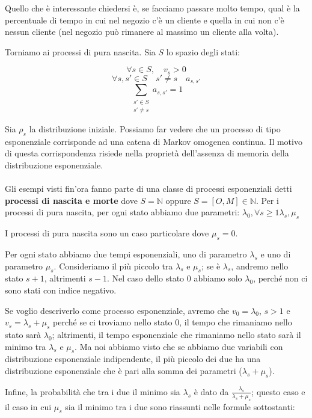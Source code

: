 \documentclass[a4paper,12pt]{book}
\begin{document}
Quello che è interessante chiedersi è, se facciamo passare molto tempo, qual è la percentuale di tempo in cui nel negozio c'è un cliente e quella in cui non c'è nessun cliente (nel negozio può rimanere al massimo un cliente alla volta).

Torniamo ai processi di pura nascita. Sia $ S $ lo spazio degli stati:

$$ \forall s \in S, \quad v_s > 0 $$
$$ \forall s,s' \in S \quad s' \ne s \quad a_{s,s'} $$
$$ \sum_{\begin{array}{c}
	s' \in S \\ 
	s' \ne s
	\end{array}} a_{s,s'} = 1$$

Sia $\rho_s$ la distribuzione iniziale. Possiamo far vedere che un processo di tipo esponenziale corrisponde ad una catena di Markov omogenea continua. Il motivo di questa corrispondenza risiede nella proprietà dell'assenza di memoria della distribuzione esponenziale. \\
\\
Gli esempi visti fin'ora fanno parte di una classe di processi esponenziali detti \textbf{processi di nascita e morte} dove $ S = \mathbb{N} $ oppure $ S = [O, M] \in \mathbb{N} $. Per i processi di pura nascita, per ogni stato abbiamo due parametri: $\lambda_0, \forall s \ge 1 \lambda_s, \mu_s$

I processi di pura nascita sono un caso particolare dove $\mu_s = 0$.

Per ogni stato abbiamo due tempi esponenziali, uno di parametro $\lambda_s$ e uno di parametro $\mu_s$. Consideriamo il più piccolo tra $\lambda_{s}$ e $\mu_s$; se è $\lambda_{s}$, andremo nello stato $ s+1 $, altrimenti $ s-1 $. Nel caso dello stato 0 abbiamo solo $\lambda_0$, perché non ci sono stati con indice negativo. 

Se voglio descriverlo come processo esponenziale, avremo che $ v_0 = \lambda_0 $, $ s > 1 $ e $ v_s = \lambda_s + \mu_s $ perché se ci troviamo nello stato 0, il tempo che rimaniamo nello stato sarà $\lambda_0$; altrimenti, il tempo esponenziale che rimaniamo nello stato sarà il minimo tra $\lambda_s$ e $ \mu_s $. Ma noi abbiamo visto che se abbiamo due variabili con distribuzione esponenziale indipendente, il più piccolo dei due ha una distribuzione esponenziale che è pari alla somma dei parametri ($ \lambda_s +\mu _s $). 

Infine, la probabilità che tra i due il minimo sia $\lambda_s$ è dato da $\frac{\lambda_s}{\lambda_s + \mu_s}$; questo caso e il caso in cui $\mu_s$ sia il minimo tra i due sono riassunti nelle formule sottostanti:
\end{document}
